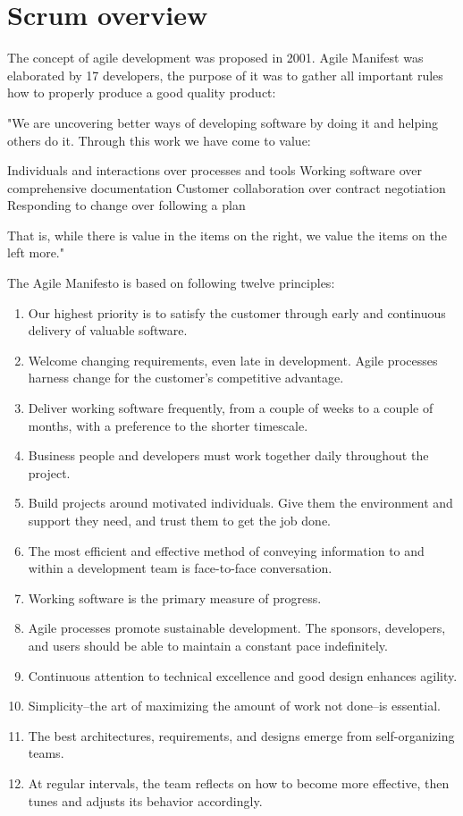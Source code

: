 \chapter{Scrum overview}
The concept of agile development was proposed in 2001. Agile Manifest was elaborated by 17 developers, the purpose of it was to gather all important rules how to properly produce a good quality product:

"We are uncovering better ways of developing
software by doing it and helping others do it.
Through this work we have come to value:

Individuals and interactions over processes and tools \hfill \break
Working software over comprehensive documentation \hfill \break
Customer collaboration over contract negotiation \hfill \break
Responding to change over following a plan \hfill \break

That is, while there is value in the items on
the right, we value the items on the left more." \cite{AgileManifesto}

The Agile Manifesto is based on following twelve principles:

\begin{enumerate}
    \item Our highest priority is to satisfy the customer
through early and continuous delivery
of valuable software.
\item Welcome changing requirements, even late in 
development. Agile processes harness change for 
the customer's competitive advantage.
\item Deliver working software frequently, from a 
couple of weeks to a couple of months, with a 
preference to the shorter timescale.
\item Business people and developers must work 
together daily throughout the project.
\item Build projects around motivated individuals. 
Give them the environment and support they need, 
and trust them to get the job done.
\item The most efficient and effective method of 
conveying information to and within a development 
team is face-to-face conversation.
\item Working software is the primary measure of progress.
\item Agile processes promote sustainable development. 
The sponsors, developers, and users should be able 
to maintain a constant pace indefinitely.
\item Continuous attention to technical excellence 
and good design enhances agility.
\item Simplicity--the art of maximizing the amount 
of work not done--is essential.
\item The best architectures, requirements, and designs 
emerge from self-organizing teams.
\item At regular intervals, the team reflects on how 
to become more effective, then tunes and adjusts 
its behavior accordingly.\cite{AgileManifesto}
\end{enumerate} 

